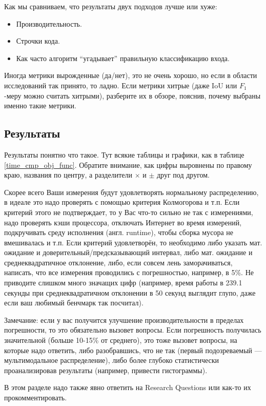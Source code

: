 Как мы сравниваем, что результаты двух подходов лучше или хуже:
\begin{itemize}
    \item Производительность.
    \item Строчки кода.
    \item Как часто алгоритм \enquote{угадывает} правильную класси\-фикацию входа.
\end{itemize}

\noindent Иногда метрики вырожденные (да/нет), это не очень хорошо, но если в области исследований так принято, то ладно. Если метрики хитрые (даже IoU или $F_1$-меру можно считать хитрыми), разберите их в обзоре, пояснив, почему выбраны именно такие метрики.

\subsection{Результаты}
Результаты понятно что такое. Тут всякие таблицы и графики, как в таблице \ref{time_cmp_obj_func}. Обратите внимание, как цифры выровнены по правому краю, названия по центру, а разделители $\times$ и $\pm$ друг под другом.

Скорее всего Ваши измерения будут удовлетворять нормальному распределению, в идеале это надо проверять с помощью критерия Кол\-могорова и т.п.
Если критерий этого не подтверждает, то у Вас что-то сильно не так с измерениями, надо проверять кэши процессора, отключать Интернет во время измерений, подкручивать среду исполне\-ния (англ. runtime), что\-бы сборка мусора не вмешивалась и т.п.
Если критерий удовлетворён, то необходимо либо указать мат. ожидание и доверительный/предсказы\-вающий интервал, либо мат. ожидание и среднеквадратичное отклонение, либо, если совсем лень заморачиваться, написать, что все измерения проводились с погрешностью, например, в 5\%. Не приводите слишком много значащих цифр (например, время работы в 239.1 секунды при среднеквадратичном отклонении в 50 секунд выглядит глупо, даже если ваш любимый бенчмарк так посчитал).

Замечание: если у вас получится улуч\-шение производительности в пределах погреш\-ности, то это обязательно вызовет вопросы. Если погрешность получилась значительной (больше 10-15\% от среднего), это тоже вызовет вопросы, на которые надо ответить, либо разобравшись, что не так (первый подозреваемый --- мультимодальное распределение), либо более глубоко статистически проанализировав результаты (например, привести гистограммы).

В этом разделе надо также явно ответить на Research Questions или как-то их прокомментировать.

